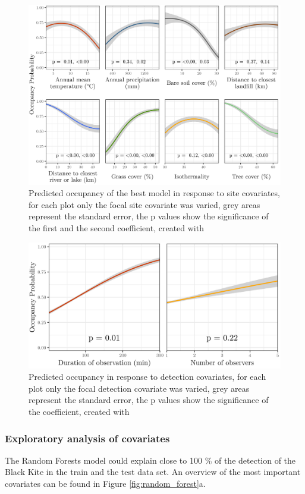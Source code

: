 \begin{multicols}{2}
\begin{figure}[t]
	\centering
	\includegraphics[width=\linewidth]{img/site_covariates}
	\caption{Predicted occupancy of the best model in response to site covariates, for each plot only the focal site covariate was varied, grey areas represent the standard error, the p values show the significance of the first and the second coefficient, created with \textcite{ggplot2}}
	\label{fig:site}
\end{figure}

\begin{figure}[t]
	\centering
	\includegraphics[width=0.8\linewidth]{img/det_covariates}
	\caption{Predicted occupancy in response to detection covariates, for each plot only the focal detection covariate was varied, grey areas represent the standard error, the p values show the significance of the coefficient, created with \textcite{ggplot2}}
	\label{fig:det}
\end{figure}


\subsubsection*{Exploratory analysis of covariates}
The Random Forests model could explain close to 100 \% of the detection of the Black Kite in the train and the test data set. An overview of the most important covariates can be found in Figure \ref{fig:random_forest}a. 


\end{multicols}
